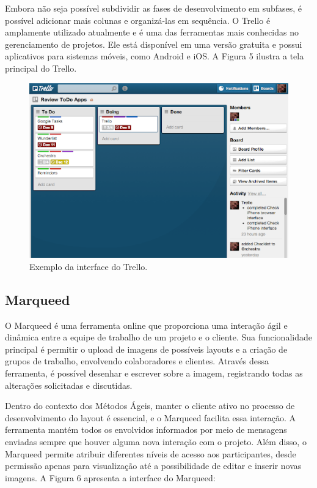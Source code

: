 Embora não seja possível subdividir as fases de desenvolvimento em subfases, é possível adicionar mais colunas e organizá-las em sequência. O Trello é amplamente utilizado atualmente e é uma das ferramentas mais conhecidas no gerenciamento de projetos. Ele está disponível em uma versão gratuita e possui aplicativos para sistemas móveis, como Android e iOS. A Figura 5 ilustra a tela principal do Trello.

\begin{figure}[htb]
	\caption{\label{fig:Fig_5}Exemplo da interface do Trello.}
	\begin{center}
		\includegraphics{figuras/Imagem5.png}
	\end{center}
\end{figure}

\subsection{Marqueed}

O Marqueed é uma ferramenta online que proporciona uma interação ágil e dinâmica entre a equipe de trabalho de um projeto e o cliente. Sua funcionalidade principal é permitir o upload de imagens de possíveis layouts e a criação de grupos de trabalho, envolvendo colaboradores e clientes. Através dessa ferramenta, é possível desenhar e escrever sobre a imagem, registrando todas as alterações solicitadas e discutidas.

Dentro do contexto dos Métodos Ágeis, manter o cliente ativo no processo de desenvolvimento do layout é essencial, e o Marqueed facilita essa interação. A ferramenta mantém todos os envolvidos informados por meio de mensagens enviadas sempre que houver alguma nova interação com o projeto. Além disso, o Marqueed permite atribuir diferentes níveis de acesso aos participantes, desde permissão apenas para visualização até a possibilidade de editar e inserir novas imagens. A Figura 6 apresenta a interface do Marqueed:


